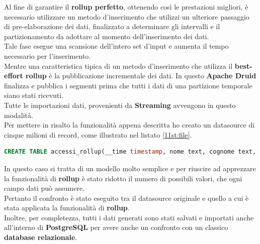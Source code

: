 \noindent
Al fine di garantire il \textbf{rollup perfetto}, ottenendo così le prestazioni migliori, è necessario utilizzare un metodo d'inserimento 
che utilizzi un ulteriore passaggio di pre-elaborazione dei dati, finalizzato a determinare gli intervalli e il partizionamento da adottare 
al momento dell'inserimento dei dati. \\
Tale fase esegue una scansione dell'intero set d'input e aumenta il tempo necessario per l'inserimento.
\\Mentre una caratteristica tipica di un metodo d'inserimento che utilizza il \textbf{best-effort rollup} è la pubblicazione incrementale dei dati.
In questo \textbf{Apache Druid} finalizza e pubblica i segmenti prima che tutti i dati di una partizione temporale siano stati ricevuti. 
 \pagebreak   \\Tutte le importazioni dati, provenienti da \textbf{Streaming} avvengono in questo modalità.\\
\noindent Per mettere in risalto la funzionalità appena descritta ho creato un \gls{datasource}{} di cinque milioni di record, come illustrato nel listato \ref{11st:file}.
\begin{lstlisting}[language=SQL, caption=\texttt{table\_rollup.sql},label=11st:file]
    CREATE TABLE accessi_rollup(__time timestamp, nome text, cognome text, citta text, stato text, datan date, istruzione text, hobby text)
\end{lstlisting}
In questo caso si tratta di un modello molto semplice 
e per riuscire ad apprezzare la funzionalità di \textbf{rollup} è stato ridotto
il numero di possibili valori, che ogni campo dati può assumere.\\
Pertanto il confronto è stato eseguito tra il \gls{datasource}{} originale e quello a cui è stata applicata la funzionalità di \textbf{rollup}.\\
Inoltre, per completezza, tutti i dati generati sono stati salvati e importati anche all'interno di \textbf{PostgreSQL} per avere 
anche un confronto con un classico \textbf{database relazionale}.
 
\pagebreak
